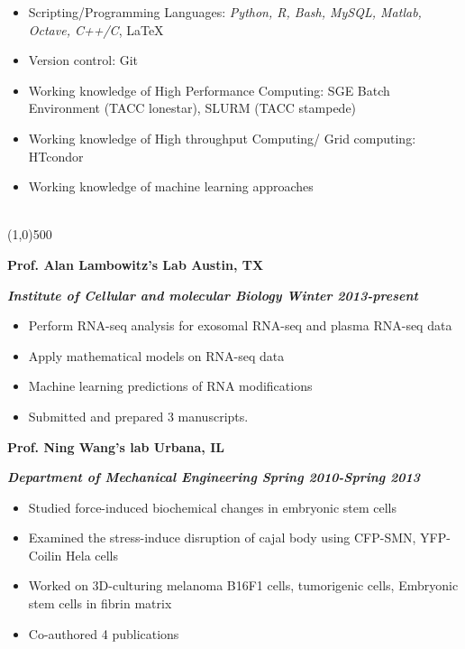 \documentclass[dvips,11pt]{article}
\begin{document}
\begin{itemize} \itemsep 1pt \parskip 0pt \parsep 0pt
	\setlength{\itemsep}{0pt}
	\item Scripting/Programming Languages: {\it Python, R, Bash, MySQL, Matlab, Octave, C++/C}, \LaTeX
	\item Version control: Git
	\item Working knowledge of High Performance Computing: SGE Batch Environment (TACC lonestar), SLURM (TACC stampede)
	\item Working knowledge of High throughput Computing/ Grid computing: HTcondor
	\item Working knowledge of machine learning approaches
\end{itemize}



 \vspace{-2mm}
\\\noindent \line(1,0){500}\\
\vspace{-5mm}

\noindent \centerline{\bf Prof. Alan Lambowitz's Lab \hfill	Austin, TX}
\noindent \centerline{\textit{\textbf{Institute of Cellular and molecular Biology \hfill Winter 2013-present}}}
\vspace{-2mm}
\begin{itemize} \itemsep1pt \parskip0pt 
	\setlength{\itemsep}{0pt}
	\item Perform RNA-seq analysis for exosomal RNA-seq and plasma RNA-seq data
	\item Apply mathematical models on RNA-seq data
	\item Machine learning predictions of RNA modifications
	\item Submitted and prepared 3 manuscripts.
\end{itemize}

\noindent \centerline{\bf Prof. Ning Wang's lab \hfill Urbana, IL}
\noindent \centerline{\bf{\textit{Department of Mechanical Engineering \hfill Spring 2010-Spring 2013} }}
\vspace{-2mm}
\begin{itemize} \itemsep1pt \parskip0pt 
	\setlength{\itemsep}{0pt}
	\item Studied force-induced biochemical changes in embryonic stem cells
	\item Examined the stress-induce disruption of cajal body using CFP-SMN, YFP-Coilin Hela cells
	\item Worked on 3D-culturing melanoma B16F1 cells, tumorigenic cells, Embryonic stem cells in fibrin matrix 
	\item Co-authored 4 publications
\end{itemize}
\end{document}
